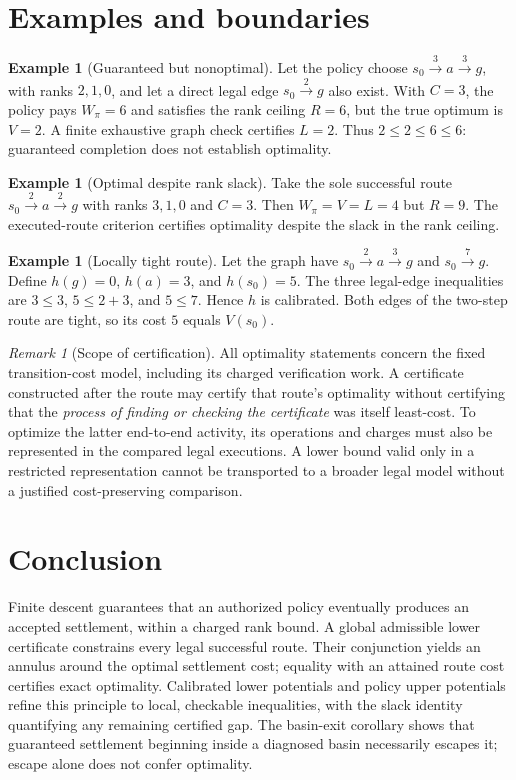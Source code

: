 \documentclass[11pt,letterpaper]{article}
\theoremstyle{definition}\newtheorem{definition}[theorem]{Definition}\newtheorem{example}[theorem]{Example}
\theoremstyle{remark}\newtheorem{remark}[theorem]{Remark}
\begin{document}
\section{Examples and boundaries}
\begin{example}[Guaranteed but nonoptimal]
Let the policy choose $s_0\xrightarrow{3}a\xrightarrow{3}g$, with ranks $2,1,0$, and let a direct legal edge $s_0\xrightarrow{2}g$ also exist. With $C=3$, the policy pays $W_\pi=6$ and satisfies the rank ceiling $R=6$, but the true optimum is $V=2$. A finite exhaustive graph check certifies $L=2$. Thus $2\le2\le6\le6$: guaranteed completion does not establish optimality.
\end{example}
\begin{example}[Optimal despite rank slack]
Take the sole successful route $s_0\xrightarrow{2}a\xrightarrow{2}g$ with ranks $3,1,0$ and $C=3$. Then $W_\pi=V=L=4$ but $R=9$. The executed-route criterion certifies optimality despite the slack in the rank ceiling.
\end{example}
\begin{example}[Locally tight route]
Let the graph have $s_0\xrightarrow{2}a\xrightarrow{3}g$ and $s_0\xrightarrow{7}g$. Define $h(g)=0$, $h(a)=3$, and $h(s_0)=5$. The three legal-edge inequalities are $3\le3$, $5\le2+3$, and $5\le7$. Hence $h$ is calibrated. Both edges of the two-step route are tight, so its cost $5$ equals $V(s_0)$.
\end{example}
\begin{remark}[Scope of certification]
All optimality statements concern the fixed transition-cost model, including its charged verification work. A certificate constructed after the route may certify that route's optimality without certifying that the \emph{process of finding or checking the certificate} was itself least-cost. To optimize the latter end-to-end activity, its operations and charges must also be represented in the compared legal executions. A lower bound valid only in a restricted representation cannot be transported to a broader legal model without a justified cost-preserving comparison.
\end{remark}

\section{Conclusion}
Finite descent guarantees that an authorized policy eventually produces an accepted settlement, within a charged rank bound. A global admissible lower certificate constrains every legal successful route. Their conjunction yields an annulus around the optimal settlement cost; equality with an attained route cost certifies exact optimality. Calibrated lower potentials and policy upper potentials refine this principle to local, checkable inequalities, with the slack identity quantifying any remaining certified gap. The basin-exit corollary shows that guaranteed settlement beginning inside a diagnosed basin necessarily escapes it; escape alone does not confer optimality.
\end{document}
